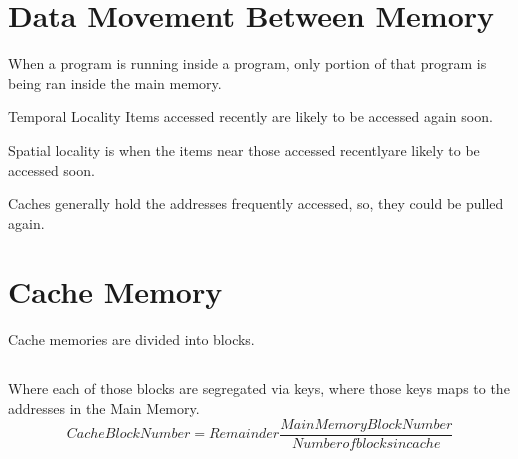 \documentclass{article}
\begin{document}
\date{June 18, 2018}
\section{Data Movement Between Memory}
When a program is running inside a program, only portion of that program is being ran inside the main memory.

Temporal Locality Items accessed recently are likely to be accessed again soon.

Spatial locality is when the items near those accessed recentlyare likely to be accessed soon.

Caches generally hold the addresses frequently accessed, so, they could be pulled again.

\section{Cache Memory}
Cache memories are divided into blocks.

\subsection{}
Where each of those blocks are segregated via keys, where those keys maps to the addresses in the Main Memory.
\begin{equation}
Cache Block Number = Remainder\frac{Main Memory Block Number}{Number of blocks in cache}
\end{equation}
\end{document}
